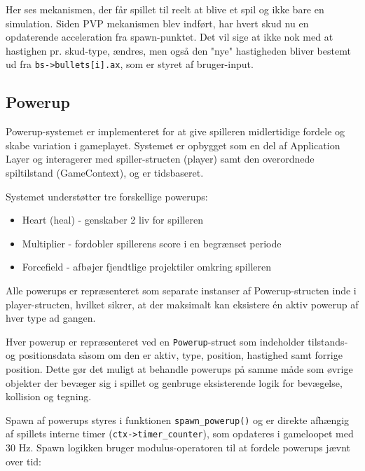 Her ses mekanismen, der får spillet til reelt at blive et spil og ikke bare en simulation. Siden PVP mekanismen blev indført, har hvert skud nu en opdaterende acceleration fra spawn-punktet. Det vil sige at ikke nok med at hastighen pr. skud-type, ændres, men også den "nye" hastigheden bliver bestemt ud fra \lstinline!bs->bullets[i].ax!, som er styret af bruger-input.

\vspace{3pt}
\subsection{Powerup}
\vspace{3pt}

Powerup-systemet er implementeret for at give spilleren midlertidige fordele og skabe variation i gameplayet. Systemet er opbygget som en del af Application Layer og interagerer med spiller-structen (player) samt den overordnede spiltilstand (GameContext), og er tidsbaseret.

Systemet understøtter tre forskellige powerups:

\begin{itemize}
    \setlength{\itemsep}{0pt}
    \setlength{\parskip}{3pt}
    \setlength{\parsep}{0pt}
    \item Heart (heal) - genskaber 2 liv for spilleren
    \item Multiplier - fordobler spillerens score i en begrænset periode
    \item Forcefield - afbøjer fjendtlige projektiler omkring spilleren
\end{itemize}

Alle powerups er repræsenteret som separate instanser af Powerup-structen inde i player-structen, hvilket sikrer, at der maksimalt kan eksistere én aktiv powerup af hver type ad gangen.

Hver powerup er repræsenteret ved en \texttt{Powerup}-struct som indeholder tilstands- og positionsdata såsom om den er aktiv, type, position, hastighed samt forrige position. Dette gør det muligt at behandle powerups på samme måde som øvrige objekter der bevæger sig i spillet og genbruge eksisterende logik for bevægelse, kollision og tegning.

Spawn af powerups styres i funktionen \texttt{spawn\_powerup()} og er direkte afhængig af spillets interne timer (\texttt{ctx->timer\_counter}), som opdateres i gameloopet med 30 Hz. Spawn logikken bruger modulus-operatoren til at fordele powerups jævnt over tid:\\

